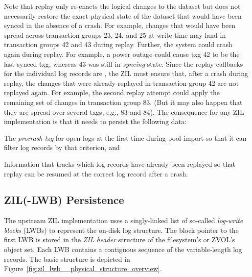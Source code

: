 \documentclass[12pt,a4paper,twoside]{book}
\begin{document}
{Note that replay only re-enacts the logical changes to the dataset but does not necessarily restore the exact physical state of the dataset that would have been synced in the absence of a crash.
For example, changes that would have been spread across transaction groups 23, 24, and 25 at write time may land in transaction groups 42 and 43 during replay.
Further, the system could crash again during replay.
For example, a power outage could cause txg 42 to be the last-synced txg, whereas 43 was still in \textit{syncing} state.
Since the replay callbacks for the individual log records are \underline{}, the ZIL must ensure that, after a crash during replay, the changes that were already replayed in transaction group 42 are not replayed again.
For example, the second replay attempt could apply the remaining set of changes in transaction group 83.
(But it may also happen that they are spread over several txgs, e.g., 83 and 84).
The consequence for any ZIL implementation is that it needs to persist the following data:
\begin{description}[noitemsep,leftmargin=1.5cm,labelindent=1cm]
    \item[Precrash-txg] The \textit{precrash-txg} for open logs at the first time during pool import so that it can filter log records by that criterion, and
    \item[Replay progress] Information that tracks which log records have already been replayed so that replay can be resumed at the correct log record after a crash.
\end{description}

\subsection{ZIL(-LWB) Persistence}\label{ch:openzfs_background:zillwb_persistence}

The upstream ZIL implementation uses a singly-linked list of so-called \textit{log-write blocks} (LWBs) to represent the on-disk log structure.
The block pointer to the first LWB is stored in the \textit{ZIL header} structure of the filesystem's or ZVOL's object set.
Each LWB contains a contiguous sequence of the variable-length log records.
The basic structure is depicted in Figure~\ref{fig:zil_lwb__physical_structure_overview}.

}
\end{document}

